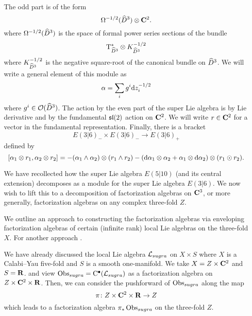 The odd part is of the form
\[
\Omega^{-1/2}(\Hat{D}^3) \otimes \C^2 .
\]
where $\Omega^{-1/2}(\Hat{D}^3)$ is the space of formal power series sections of the bundle
\[
\T_{\Hat{D}^3}^{*} \otimes K_{\Hat{D}^3}^{-1/2}
\]
where $K_{\Hat{D}^3}^{-1/2}$ is the negative square-root of the canonical bundle on $\Hat{D}^3$. 
We will write a general element of this module as 
\[
\alpha = \sum_i g^i \d z_i^{-1/2} 
\]
where $g^i \in \cO(\Hat{D}^3)$. 
The action by the even part of the super Lie algebra is by Lie derivative and by the fundamental $\lie{sl}(2)$ action on $\C^2$.
We will write $r \in \C^2$ for a vector in the fundamental representation.
Finally, there is a bracket 
\[
E(3|6)_- \times E(3|6)_- \to E(3|6)_+
\]
defined by
\[
[\alpha_1 \otimes r_1, \alpha_2 \otimes r_2] = - (\alpha_1 \wedge \alpha_2) \otimes (r_1 \wedge r_2) - (\d \alpha_1 \otimes \alpha_2 + \alpha_1 \otimes \d \alpha_2) \otimes (r_1 \odot r_2) .
\]


\parsec[s:weight]


\parsec[s:locallieE510]

We have recollected how the super Lie algebra $E(5|10)$ (and its central extension) decomposes as a module for the super Lie algebra $E(3|6)$. 
We now wish to lift this to a decomposition of factorization algebras on $\C^3$, or more generally, factorization algebras on any complex three-fold $Z$. 

We outline an approach to constructing the factorization algebras via enveloping factorization algebras of certain (infinite rank) local Lie algebras on the three-fold $X$. 
For another approach . 

We have already discussed the local Lie algebra $\cL_{sugra}$ on $X \times S$ where $X$ is a Calabi--Yau five-fold and $S$ is a smooth one-manifold. 
We take $X = Z \times \C^2$ and $S = \R$. 
and view $\Obs_{sugra} = \clie^\bu(\cL_{sugra})$ as a factorization algebra on $Z \times \C^2 \times \R$. 
Then, we can consider the pushforward of $\Obs_{sugra}$ along the map
\[
\pi \colon Z \times \C^2 \times \R \to Z 
\]
which leads to a factorization algebra $\pi_* \Obs_{sugra}$ on the three-fold $Z$. 

